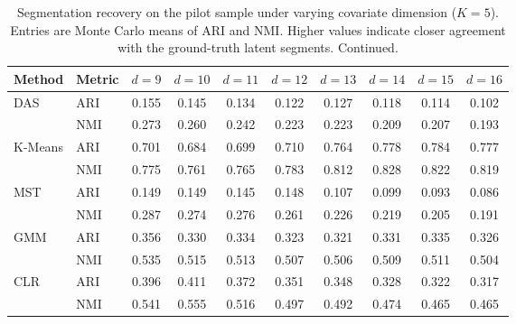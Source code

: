 \begin{table}[htbp]
\centering
\caption{Segmentation recovery on the pilot sample under varying covariate dimension ($K=5$). Entries are Monte Carlo means of ARI and NMI. Higher values indicate closer agreement with the ground-truth latent segments. Continued.}
\label{tab:app-ari-nmi-varying-d-cont}
\begin{tabular}{llcccccccc}
\toprule
Method & Metric & $d=9$ & $d=10$ & $d=11$ & $d=12$ & $d=13$ & $d=14$ & $d=15$ & $d=16$ \\
\midrule
DAS & ARI & 0.155 & 0.145 & 0.134 & 0.122 & 0.127 & 0.118 & 0.114 & 0.102 \\
 & NMI & 0.273 & 0.260 & 0.242 & 0.223 & 0.223 & 0.209 & 0.207 & 0.193 \\
\addlinespace
K-Means & ARI & 0.701 & 0.684 & 0.699 & 0.710 & 0.764 & 0.778 & 0.784 & 0.777 \\
 & NMI & 0.775 & 0.761 & 0.765 & 0.783 & 0.812 & 0.828 & 0.822 & 0.819 \\
\addlinespace
MST & ARI & 0.149 & 0.149 & 0.145 & 0.148 & 0.107 & 0.099 & 0.093 & 0.086 \\
 & NMI & 0.287 & 0.274 & 0.276 & 0.261 & 0.226 & 0.219 & 0.205 & 0.191 \\
\addlinespace
GMM & ARI & 0.356 & 0.330 & 0.334 & 0.323 & 0.321 & 0.331 & 0.335 & 0.326 \\
 & NMI & 0.535 & 0.515 & 0.513 & 0.507 & 0.506 & 0.509 & 0.511 & 0.504 \\
\addlinespace
CLR & ARI & 0.396 & 0.411 & 0.372 & 0.351 & 0.348 & 0.328 & 0.322 & 0.317 \\
 & NMI & 0.541 & 0.555 & 0.516 & 0.497 & 0.492 & 0.474 & 0.465 & 0.465 \\
\bottomrule
\end{tabular}
\end{table}

